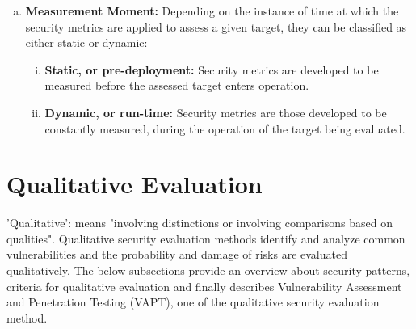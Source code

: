 \documentclass[pdftex,english,oribibl]{llncs}
\begin{document}
\begin{enumerate}[(a)]
	\item {\textbf{Measurement Moment:} Depending on the instance of time at which the security metrics are applied to assess a given target, they can be classified as either static or dynamic:}
	\begin{enumerate}[(i)]
	\item {\textbf{Static, or pre-deployment:} Security metrics are developed to be measured before the assessed target enters operation.}
	\item {\textbf{Dynamic, or run-time:} Security metrics are those developed to be constantly measured, during the operation of the target being evaluated.}
	\end{enumerate}

\end{enumerate}
	
\section{Qualitative Evaluation}\label{sec:qualitative}
'Qualitative': means "involving distinctions or involving comparisons based on qualities". Qualitative security evaluation methods identify and analyze common vulnerabilities and the probability and damage of risks are evaluated qualitatively. The below subsections provide an overview about security patterns, criteria for qualitative evaluation and finally describes Vulnerability Assessment and Penetration Testing (VAPT), one of the qualitative security evaluation method.
\end{document}

